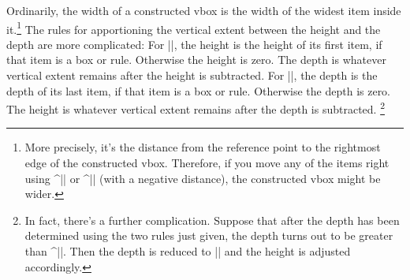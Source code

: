 Ordinarily, the width of a constructed vbox is the width of the widest
item inside it.\footnote
{More precisely, it's the distance from the reference point to the rightmost
edge of the constructed vbox.  Therefore,
if you move any of the items right using ^|\moveright| or
^|\moveleft| (with a negative distance),
the constructed vbox might be wider.}
The rules for apportioning the vertical extent between the
height and the depth are more complicated:
\ulist
\li For |\vtop|,
the height is the height of its first item, if that item is a box or rule.
Otherwise the height is zero. The depth is whatever vertical
extent remains after the height is subtracted.
\li For |\vbox|,
the depth is the depth of its last item, if that item is a box or rule.
Otherwise the depth is zero. The height is whatever vertical
extent remains after the depth is subtracted.%
\footnote{In fact, there's a further complication.
Suppose that after the depth has been determined
using the two rules just given, the depth turns out to be greater than
^|\boxmaxdepth|.
Then the depth is reduced to |\boxmaxdepth| and the height is adjusted
accordingly.}
\endulist

